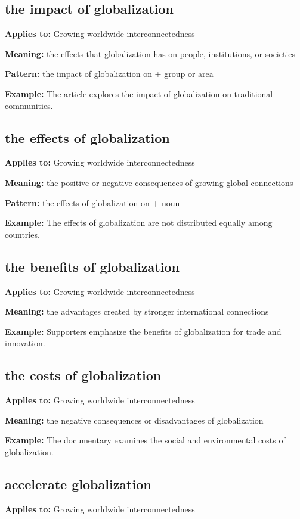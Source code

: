\documentclass[11pt]{article}
\begin{document}
\subsection{the impact of globalization}
\textbf{Applies to:} Growing worldwide interconnectedness

\textbf{Meaning:} the effects that globalization has on people, institutions, or societies

\textbf{Pattern:} the impact of globalization on + group or area

\textbf{Example:} The article explores the impact of globalization on traditional communities.

\subsection{the effects of globalization}
\textbf{Applies to:} Growing worldwide interconnectedness

\textbf{Meaning:} the positive or negative consequences of growing global connections

\textbf{Pattern:} the effects of globalization on + noun

\textbf{Example:} The effects of globalization are not distributed equally among countries.

\subsection{the benefits of globalization}
\textbf{Applies to:} Growing worldwide interconnectedness

\textbf{Meaning:} the advantages created by stronger international connections

\textbf{Example:} Supporters emphasize the benefits of globalization for trade and innovation.

\subsection{the costs of globalization}
\textbf{Applies to:} Growing worldwide interconnectedness

\textbf{Meaning:} the negative consequences or disadvantages of globalization

\textbf{Example:} The documentary examines the social and environmental costs of globalization.

\subsection{accelerate globalization}
\textbf{Applies to:} Growing worldwide interconnectedness
\end{document}
